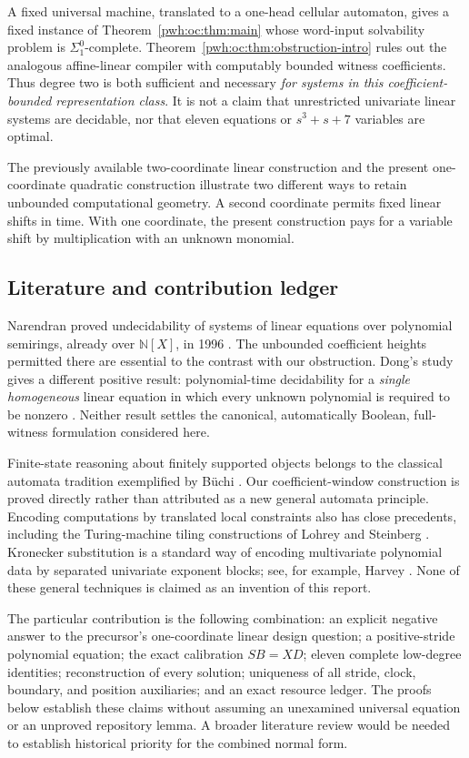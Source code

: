 \documentclass[11pt,letterpaper]{article}
\numberwithin{equation}{section}
\theoremstyle{definition}
\newcommand{\N}{\mathbb N}
\begin{document}
A fixed universal machine, translated to a one-head cellular automaton,
gives a fixed instance of Theorem~\ref{pwh:oc:thm:main} whose word-input solvability
problem is $\Sigma^0_1$-complete. Theorem~\ref{pwh:oc:thm:obstruction-intro} rules out
the analogous affine-linear compiler with computably bounded witness
coefficients. Thus degree two is both sufficient and necessary \emph{for
systems in this coefficient-bounded representation class}. It is not a
claim that unrestricted univariate linear systems are decidable, nor that
eleven equations or $s^3+s+7$ variables are optimal.

The previously available two-coordinate linear construction and the present
one-coordinate quadratic construction illustrate two different ways to
retain unbounded computational geometry. A second coordinate permits
fixed linear shifts in time. With one coordinate, the present construction
pays for a variable shift by multiplication with an unknown monomial.

\subsection{Literature and contribution ledger}

Narendran proved undecidability of systems of linear equations over
polynomial semirings, already over $\N[X]$, in 1996 \cite{oc:Narendran}.
The unbounded coefficient heights permitted there are essential to the
contrast with our obstruction. Dong's study gives a different positive
result: polynomial-time decidability for a \emph{single homogeneous}
linear equation in which every unknown polynomial is required to be
nonzero \cite{oc:Dong}. Neither result settles the canonical, automatically
Boolean, full-witness formulation considered here.

Finite-state reasoning about finitely supported objects belongs to the
classical automata tradition exemplified by B\"uchi \cite{oc:Buchi}.
Our coefficient-window construction is proved directly rather than
attributed as a new general automata principle. Encoding computations by
translated local constraints also has close precedents, including the
Turing-machine tiling constructions of Lohrey and Steinberg
\cite{oc:LohreySteinberg}. Kronecker substitution is a standard way of
encoding multivariate polynomial data by separated univariate exponent
blocks; see, for example, Harvey \cite{oc:Harvey}. None of these general
techniques is claimed as an invention of this report.

The particular contribution is the following combination: an explicit
negative answer to the precursor's one-coordinate linear design question;
a positive-stride polynomial equation; the exact calibration $SB=XD$;
eleven complete low-degree identities; reconstruction of every solution;
uniqueness of all stride, clock, boundary, and position auxiliaries; and
an exact resource ledger. The proofs below establish these claims without
assuming an unexamined universal equation or an unproved repository lemma.
A broader literature review would be needed to establish historical
priority for the combined normal form.
\end{document}

